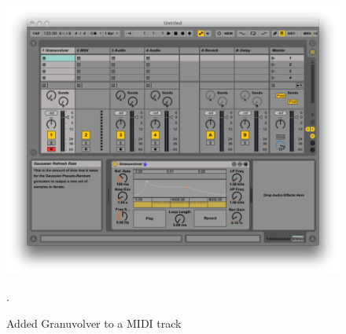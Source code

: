 \documentclass{article}
\begin{document}
\begin{enumerate}
				\begin{figure}[h!]
				  \centering
			    \includegraphics[width=1\textwidth]{images/ableton}
				  \caption{Added Granuvolver to a MIDI track}
					\label{Ableton_MIDI_Granuvolver}.
				\end{figure}

				\end{enumerate}
\end{document}
